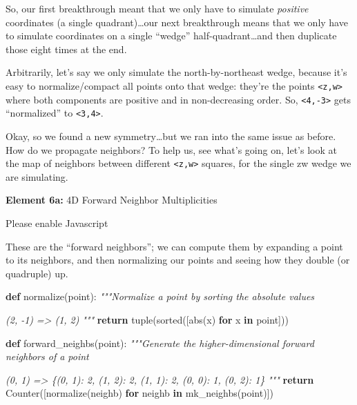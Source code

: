 \documentclass[]{article}
\newenvironment{Shaded}{}{}
\newcommand{\BuiltInTok}[1]{#1}
\newcommand{\CommentTok}[1]{\textcolor[rgb]{0.38,0.63,0.69}{\textit{#1}}}
\newcommand{\ControlFlowTok}[1]{\textcolor[rgb]{0.00,0.44,0.13}{\textbf{#1}}}
\newcommand{\KeywordTok}[1]{\textcolor[rgb]{0.00,0.44,0.13}{\textbf{#1}}}
\newcommand{\NormalTok}[1]{#1}
\begin{document}
So, our first breakthrough meant that we only have to simulate \emph{positive}
coordinates (a single quadrant)\ldots our next breakthrough means that we only
have to simulate coordinates on a single ``wedge'' half-quadrant\ldots and then
duplicate those eight times at the end.

Arbitrarily, let's say we only simulate the north-by-northeast wedge, because
it's easy to normalize/compact all points onto that wedge: they're the points
\texttt{\textless{}z,w\textgreater{}} where both components are positive and in
non-decreasing order. So, \texttt{\textless{}4,-3\textgreater{}} gets
``normalized'' to \texttt{\textless{}3,4\textgreater{}}.

Okay, so we found a new symmetry\ldots but we ran into the same issue as before.
How do we propagate neighbors? To help us, see what's going on, let's look at
the map of neighbors between different \texttt{\textless{}z,w\textgreater{}}
squares, for the single zw wedge we are simulating.

\leavevmode\hypertarget{golSyms4DForward}{}%
\textbf{Element 6a:} 4D Forward Neighbor Multiplicities

\leavevmode\hypertarget{golSyms4DForwardCont}{}%
Please enable Javascript

These are the ``forward neighbors''; we can compute them by expanding a point to
its neighbors, and then normalizing our points and seeing how they double (or
quadruple) up.

\begin{Shaded}
\begin{Highlighting}[]
\KeywordTok{def}\NormalTok{ normalize(point):}
    \CommentTok{"""Normalize a point by sorting the absolute values}

\CommentTok{    (2, {-}1)}
\CommentTok{    => (1, 2)}
\CommentTok{    """}
    \ControlFlowTok{return} \BuiltInTok{tuple}\NormalTok{(}\BuiltInTok{sorted}\NormalTok{([}\BuiltInTok{abs}\NormalTok{(x) }\ControlFlowTok{for}\NormalTok{ x }\KeywordTok{in}\NormalTok{ point]))}

\KeywordTok{def}\NormalTok{ forward\_neighbs(point):}
    \CommentTok{"""Generate the higher{-}dimensional forward neighbors of a point}

\CommentTok{    (0, 1)}
\CommentTok{    => \{(0, 1): 2, (1, 2): 2, (1, 1): 2, (0, 0): 1, (0, 2): 1\}}
\CommentTok{    """}
    \ControlFlowTok{return}\NormalTok{ Counter([normalize(neighb) }\ControlFlowTok{for}\NormalTok{ neighb }\KeywordTok{in}\NormalTok{ mk\_neighbs(point)])}
\end{Highlighting}
\end{Shaded}
\end{document}
